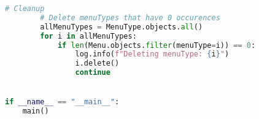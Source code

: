 \begin{lstlisting}[language=Python]
        # Cleanup
        # Delete menuTypes that have 0 occurences
        allMenuTypes = MenuType.objects.all()
        for i in allMenuTypes:
            if len(Menu.objects.filter(menuType=i)) == 0:
                log.info(f"Deleting menuType: {i}")
                i.delete()
                continue


if __name__ == "__main__":
    main()
\end{lstlisting}